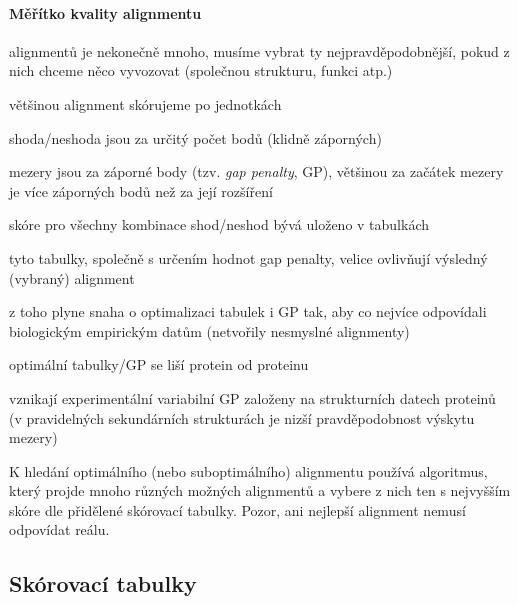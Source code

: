 \documentclass[DIV=8]{scrreprt}
\begin{document}
\paragraph{Měřítko kvality alignmentu}
\begin{myItemize}[nosep]
    \item alignmentů je nekonečně mnoho, musíme vybrat ty nejpravděpodobnější, pokud z nich chceme něco vyvozovat (společnou strukturu, funkci atp.)
    \item většinou alignment skórujeme po jednotkách
\begin{myItemize}[nosep]
    \item shoda/neshoda jsou za určitý počet bodů (klidně záporných)
    \item mezery jsou za záporné body (tzv. \emph{gap penalty}, GP), většinou za začátek mezery je více záporných bodů než za její rozšíření
\end{myItemize}

    \item skóre pro všechny kombinace shod/neshod bývá uloženo v tabulkách
    \item tyto tabulky, společně s určením hodnot gap penalty, velice ovlivňují výsledný (vybraný) alignment
\begin{myItemize}[nosep]
    \item z toho plyne snaha o optimalizaci tabulek i GP tak, aby co nejvíce odpovídali biologickým empirickým datům (netvořily nesmyslné alignmenty)
    \item optimální tabulky/GP se liší protein od proteinu
    \item vznikají experimentální variabilní GP založeny na strukturních datech proteinů (v pravidelných sekundárních strukturách je nizší pravděpodobnost výskytu mezery)
\end{myItemize}

\end{myItemize}



K hledání optimálního (nebo suboptimálního) alignmentu používá algoritmus, který projde mnoho různých možných alignmentů a vybere z nich ten s nejvyšším skóre dle přidělené skórovací tabulky. Pozor, ani nejlepší alignment nemusí odpovídat reálu.

\subsection{Skórovací tabulky} \label{Skórovací tabulky}
\end{document}
